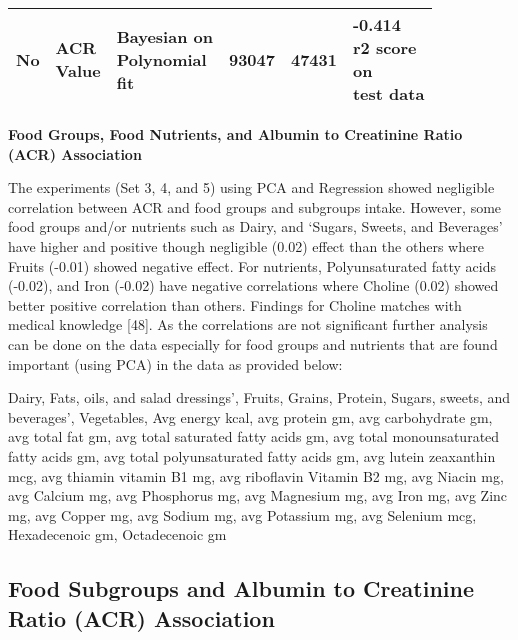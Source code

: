\begin{table}[!htb]
\begin{tabular}{ | p{1.1cm} | p{1.1cm} | p{1.45cm} | p{0.9cm} | p{0.9cm} | p{1.5cm} | }
\hline
No	& 
\specialcell{ACR \\Value}	& 
\specialcell{Bayesian on \\ Polynomial \\ fit}	& 
93047	& 
47431	& 
\specialcell {-0.414 \\ r2 score \\on \\test data }  \\
\hline
\end{tabular}
\end{table}


\noindent \textbf{Food Groups, Food Nutrients, and Albumin to Creatinine Ratio (ACR) Association}

\noindent The experiments (Set 3, 4, and 5) using PCA and Regression showed negligible correlation between ACR and food groups and subgroups intake. However, some food groups and/or nutrients such as Dairy, and  `Sugars, Sweets, and Beverages'  have higher and positive though negligible (0.02) effect than the others where Fruits (-0.01) showed negative effect.  For nutrients, Polyunsaturated fatty acids (-0.02), and Iron (-0.02) have negative correlations where Choline (0.02) showed better positive correlation than others. Findings for Choline matches with medical knowledge [48]. As the correlations are not significant further analysis can be done on the data especially for food groups and nutrients that are found important (using PCA) in the data as provided below:

\noindent Dairy,  Fats, oils, and salad dressings’,  Fruits,  Grains,  Protein,   Sugars, sweets, and beverages’, Vegetables, Avg energy kcal,  avg protein gm,  avg carbohydrate gm,  avg total fat gm,  avg total saturated fatty acids gm, avg total monounsaturated fatty acids gm,  avg total polyunsaturated fatty acids gm, avg lutein zeaxanthin mcg,  avg thiamin vitamin B1 mg,  avg riboflavin Vitamin B2 mg,  avg Niacin mg, avg Calcium mg,  avg Phosphorus mg,  avg Magnesium mg,  avg Iron mg, avg Zinc mg,  avg Copper mg,  avg Sodium mg,  avg Potassium mg,  avg Selenium mcg,  Hexadecenoic gm,  Octadecenoic gm

\subsection{Food Subgroups and Albumin to Creatinine Ratio (ACR) Association}

